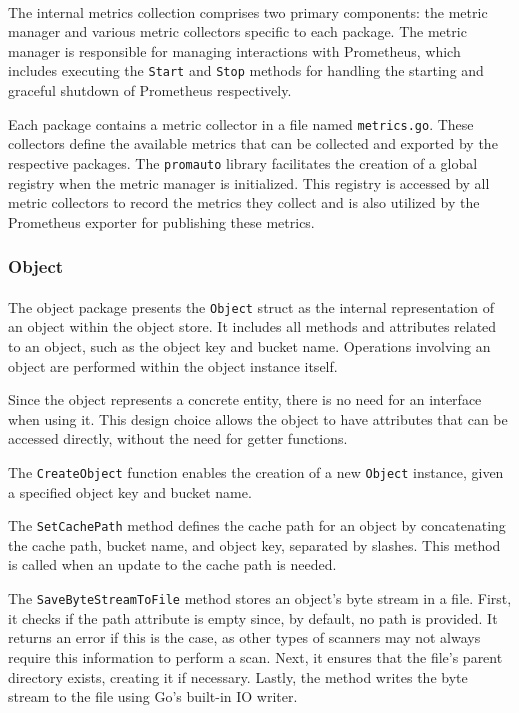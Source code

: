 \documentclass[12pt, conference, final, a4paper, onecolumn, compsoc]{IEEEtran}
\begin{document}
\paragraph{}

The internal metrics collection comprises two primary components: the metric
manager and various metric collectors specific to each package. The metric
manager is responsible for managing interactions with Prometheus, which includes
executing the \texttt{Start} and \texttt{Stop} methods for handling the starting
and graceful shutdown of Prometheus respectively.

Each package contains a metric collector in a file named \texttt{metrics.go}.
These collectors define the available metrics that can be collected and exported
by the respective packages. The \texttt{promauto} library facilitates the
creation of a global registry when the metric manager is initialized. This
registry is accessed by all metric collectors to record the metrics they collect
and is also utilized by the Prometheus exporter for publishing these metrics.

\subsubsection*{Object}
\paragraph{}

The object package presents the \texttt{Object} struct as the internal
representation of an object within the object store. It includes all methods and
attributes related to an object, such as the object key and bucket name.
Operations involving an object are performed within the object instance itself.

Since the object represents a concrete entity, there is no need for an interface
when using it. This design choice allows the object to have attributes that can
be accessed directly, without the need for getter functions.

The \texttt{CreateObject} function enables the creation of a new \texttt{Object}
instance, given a specified object key and bucket name.

The \texttt{SetCachePath} method defines the cache path for an object by
concatenating the cache path, bucket name, and object key, separated by slashes.
This method is called when an update to the cache path is needed.

The \texttt{SaveByteStreamToFile} method stores an object's byte stream in a
file. First, it checks if the path attribute is empty since, by default, no path
is provided. It returns an error if this is the case, as other types of scanners
may not always require this information to perform a scan. Next, it ensures that
the file's parent directory exists, creating it if necessary. Lastly, the method
writes the byte stream to the file using Go's built-in IO writer.
\end{document}
